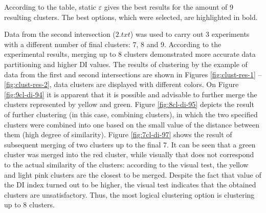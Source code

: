 According to the table, static $\varepsilon$ gives the best results for the amount of 9 resulting clusters. The best options, which were selected, are highlighted in bold.

Data from the second intersection ($2.txt$) was used to carry out 3 experiments with a different number of final clusters: 7, 8 and 9. According to the experimental results, merging up to 8 clusters demonstrated more accurate data partitioning and higher DI values. The results of clustering by the example of data from the first and second intersections are shown in Figures \ref{fig:clust-res-1} -- \ref{fig:clust-res-2}, data clusters are displayed with different colors. On Figure \ref{fig:9cl-di-94} it is apparent that it is possible and advisable to further merge the clusters represented by yellow and green. Figure \ref{fig:8cl-di-95} depicts the result of further clustering (in this case, combining clusters), in which the two specified clusters were combined into one based on the small value of the distance between them (high degree of similarity). Figure \ref{fig:7cl-di-97} shows the result of subsequent merging of two clusters up to the final 7. It can be seen that a green cluster was merged into the red cluster, while visually that does not correspond to the actual similarity of the clusters: according to the visual test, the yellow and light pink clusters are the closest to be merged. Despite the fact that value of the DI index turned out to be higher, the visual test indicates that the obtained clusters are unsatisfactory. Thus, the most logical clustering option is clustering up to 8 clusters.

